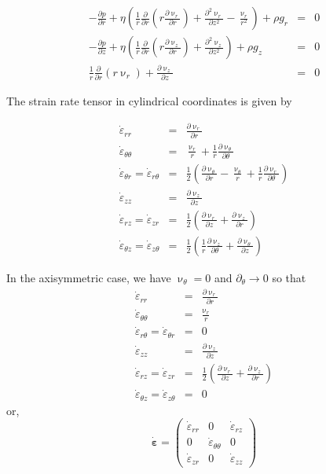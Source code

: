 \begin{eqnarray}
-\frac{\partial p}{\partial r} + \eta
\left(
\frac1r \frac{\partial}{\partial r} ( r  \frac{\partial \upnu_r}{\partial r}   ) 
+  \frac{\partial^2 \upnu_r}{\partial z^2} - \frac{\upnu_r}{r^2}
\right) +\rho g_r&=& 0 
\\
-\frac{\partial p}{\partial z} + \eta
\left(
\frac1r \frac{\partial}{\partial r} ( r  \frac{\partial \upnu_z}{\partial r}   ) 
+  \frac{\partial^2 \upnu_z}{\partial z^2} 
\right) +\rho g_z&=& 0 \\
\frac1r \frac{\partial}{\partial r} (r \upnu_r) + \frac{\partial \upnu_z}{\partial z} &=& 0
\end{eqnarray}


The strain rate tensor in cylindrical coordinates is given by 

\begin{eqnarray}
\dot\varepsilon_{rr} 
&=& \frac{\partial \upnu_r}{\partial r} 
\\
\dot\varepsilon_{\theta\theta} 
&=& \frac{\upnu_r}{r} + \frac{1}{r} \frac{\partial \upnu_\theta}{\partial \theta}  
\\
\dot\varepsilon_{\theta r} = \dot\varepsilon_{r\theta} 
&=& \frac{1}{2} \left(   \frac{\partial \upnu_\theta}{\partial r} - \frac{\upnu_\theta}{r} 
+\frac{1}{r} \frac{\partial \upnu_r}{\partial \theta}  \right)
\\
\dot\varepsilon_{zz} 
&=& \frac{\partial \upnu_z}{\partial z} 
\\
\dot{\varepsilon}_{rz} = \dot{\varepsilon}_{zr} 
&=& \frac{1}{2}\left( \frac{\partial \upnu_r}{\partial z} + \frac{\partial \upnu_z}{\partial r}  \right) 
\\
\dot{\varepsilon}_{\theta z} = \dot{\varepsilon}_{z \theta} &=& \frac{1}{2}\left( 
\frac{1}{r} \frac{\partial \upnu_z}{\partial \theta} + \frac{\partial \upnu_\theta}{\partial z}  \right) 
\end{eqnarray}

In the axisymmetric case, we have $\upnu_\theta=0$ and $\partial_\theta \rightarrow 0$ so that 
\begin{eqnarray}
\dot\varepsilon_{rr} &=& \frac{\partial \upnu_r}{\partial r}  \\
\dot\varepsilon_{\theta\theta} &=& \frac{\upnu_r}{r} \\
\dot\varepsilon_{r\theta} = \dot\varepsilon_{\theta r} &=& 0\\
\dot\varepsilon_{zz} &=& \frac{\partial \upnu_z}{\partial z} \\
\dot{\varepsilon}_{rz} = \dot{\varepsilon}_{zr} 
&=& \frac{1}{2}\left( \frac{\partial \upnu_r}{\partial z} + \frac{\partial \upnu_z}{\partial r}  \right) \\
\dot{\varepsilon}_{\theta z} = \dot{\varepsilon}_{z \theta} &=& 0
\end{eqnarray}
or, 
\[
\dot{\bm\varepsilon}
=
\left(
\begin{array}{ccc}
\dot\varepsilon_{rr} & 0 & \dot{\varepsilon}_{rz} \\
0 & \dot{\varepsilon}_{\theta\theta}  & 0 \\
\dot{\varepsilon}_{zr} & 0 & \dot\varepsilon_{zz}
\end{array}
\right)
\]

